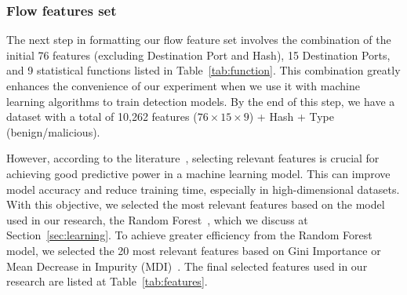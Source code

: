 \subsubsection{Flow features set}\label{sec:set}


The next step in formatting our flow feature set involves the combination of the initial 76 features (excluding Destination Port and Hash), 15 Destination Ports, and 9 statistical functions listed in Table~\ref{tab:function}. This combination greatly enhances the convenience of our experiment when we use it with machine learning algorithms to train detection models. By the end of this step, we have a dataset with a total of 10,262 features ($76\times15\times9$) + Hash + Type (benign/malicious).

However, according to the literature~\cite{DBLP:conf/ichmi/Xie22,DBLP:journals/mta/AmiriebrahimabadiM24}, selecting relevant features is crucial for achieving good predictive power in a machine learning model. This can improve model accuracy and reduce training time, especially in high-dimensional datasets. With this objective, we selected the most relevant features based on the model used in our research, the Random Forest~\cite{james2023introduction}, which we discuss at Section~\ref{sec:learning}. To achieve greater efficiency from the Random Forest model, we selected the 20 most relevant features based on Gini Importance or Mean Decrease in Impurity (MDI)~\cite{james2023introduction}. The final selected features used in our research are listed at Table~\ref{tab:features}.

